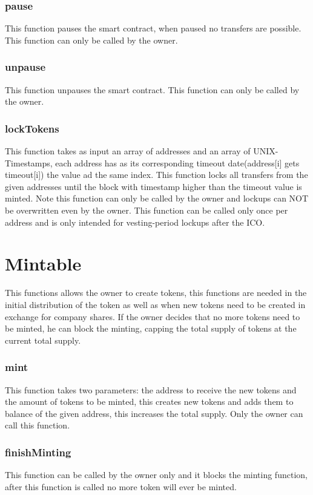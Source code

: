 \documentclass[12pt,a4paper]{article}
\begin{document}
\subsubsection*{pause}
This function pauses the smart contract, when paused no transfers are possible. This function can only be called by the owner.
\subsubsection*{unpause}
This function unpauses the smart contract. This function can only be called by the owner.
\subsubsection*{lockTokens}
This function takes as input an array of addresses and an array of UNIX-Timestamps, each address has as its corresponding timeout date(address[i] gets timeout[i]) the value ad the same index. This function locks all transfers from the given addresses until the block with timestamp higher than the timeout value is minted. Note this function can only be called by the owner and lockups can NOT be overwritten even by the owner.
This function can be called only once per address and is only intended for vesting-period lockups after the ICO.
\section*{Mintable}
This functions allows the owner to create tokens, this functions are needed in the initial distribution of the token as well as when new tokens need to be created in exchange for company shares. If the owner decides that no more tokens need to be minted, he can block the minting, capping the total supply of tokens at the current total supply.
\subsubsection*{mint}
This function takes two parameters: the address to receive the new tokens and the amount of tokens to be minted, this creates new tokens and adds them to balance of the given address, this increases the total supply. Only the owner can call this function.
\subsubsection*{finishMinting}
This function can be called by the owner only and it blocks the minting function, after this function is called no more token will ever be minted.
\end{document}
